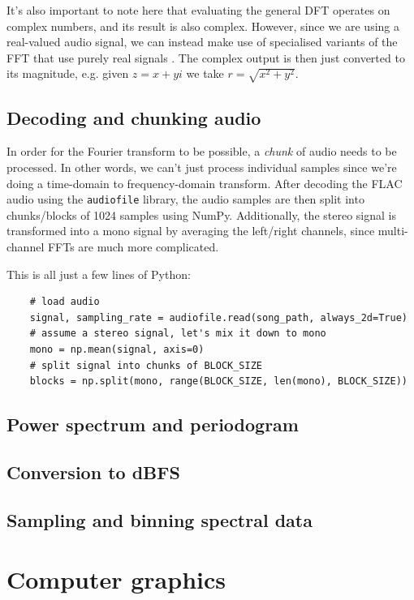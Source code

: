 \documentclass[11pt]{article}
\begin{document}
It's also important to note here that evaluating the general DFT operates on complex numbers, and its result
is also complex. However, since we are using a real-valued audio signal, we can instead make use of
specialised variants of the FFT that use purely real signals \cite{Sorensen1987}. The complex output is then
just converted to its magnitude, e.g. given $z = x + yi$ we take $r = \sqrt{x^2 + y^2}$.

\subsection{Decoding and chunking audio}
In order for the Fourier transform to be possible, a \textit{chunk} of audio needs to be processed. In other
words, we can't just process individual samples since we're doing a time-domain to frequency-domain
transform. After decoding the FLAC audio using the \verb|audiofile| library, the audio samples are then split
into chunks/blocks of 1024 samples using NumPy. Additionally, the stereo signal is transformed into a mono
signal by averaging the left/right channels, since multi-channel FFTs are much more complicated.

This is all just a few lines of Python:
\begin{verbatim}
    # load audio
    signal, sampling_rate = audiofile.read(song_path, always_2d=True)
    # assume a stereo signal, let's mix it down to mono
    mono = np.mean(signal, axis=0)
    # split signal into chunks of BLOCK_SIZE
    blocks = np.split(mono, range(BLOCK_SIZE, len(mono), BLOCK_SIZE))
\end{verbatim}

\subsection{Power spectrum and periodogram}

\subsection{Conversion to dBFS}

\subsection{Sampling and binning spectral data}

\section{Computer graphics}
\end{document}
